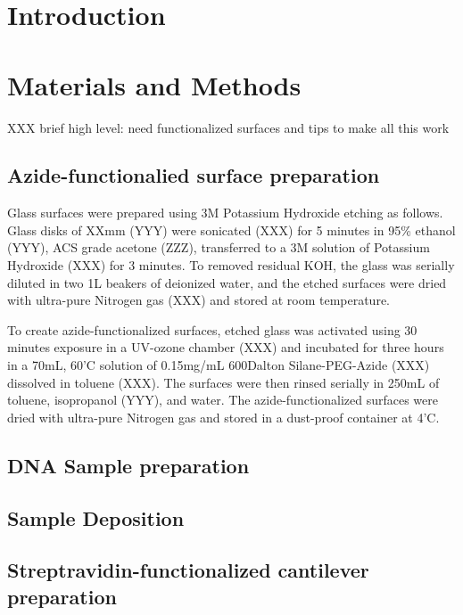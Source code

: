 \documentclass[%
  aip,12pt,tightenlines,
  amsthm,
 amsmath,amssymb,
 reprint,%
]{revtex4-1}
\newcommand{\sLabel}[1]{\label{section:#1}}
\newcommand{\firstp}[0]{\noindent}
\newcommand{\pl}[0]{\vspace{6pt}}
\begin{document}
\section{\sLabel{Intro}Introduction}

\section{\sLabel{Materials}Materials and Methods}

XXX brief high level: need functionalized surfaces and tips to make all this work

\subsection{\sLabel{Surface}Azide-functionalied surface preparation}

\firstp Glass surfaces were prepared using 3M Potassium Hydroxide etching as follows. Glass disks of XXmm (YYY) were sonicated (XXX) for 5 minutes in 95\% ethanol (YYY), ACS grade acetone (ZZZ), transferred to a 3M solution of Potassium Hydroxide (XXX) for 3 minutes. To removed residual KOH, the glass was serially diluted in two 1L beakers of deionized water, and the etched surfaces were dried with ultra-pure Nitrogen gas (XXX) and stored at room temperature. \pl

To create azide-functionalized surfaces, etched glass was activated using 30 minutes exposure in a UV-ozone chamber (XXX) and incubated for three hours in a 70mL, 60'C solution of 0.15mg/mL 600Dalton Silane-PEG-Azide (XXX) dissolved in toluene (XXX). The surfaces were then rinsed serially in 250mL of toluene, isopropanol (YYY), and water. The azide-functionalized surfaces were dried with ultra-pure Nitrogen gas and stored in a dust-proof container at 4'C. \pl 

\subsection{\sLabel{Sample}DNA Sample preparation}

\subsection{\sLabel{Deposition}Sample Deposition}

\subsection{\sLabel{Cantilevers}Streptravidin-functionalized cantilever preparation}
\end{document}
